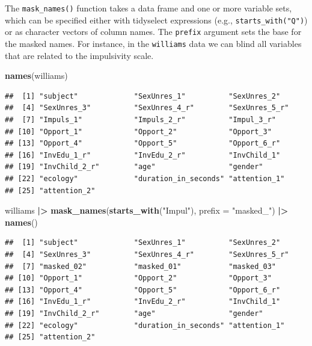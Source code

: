 \documentclass[
  english,
  man,floatsintext]{apa6}
\newenvironment{Shaded}{\begin{snugshade}}{\end{snugshade}}
\newcommand{\AttributeTok}[1]{\textcolor[rgb]{0.13,0.29,0.53}{#1}}
\newcommand{\FunctionTok}[1]{\textcolor[rgb]{0.13,0.29,0.53}{\textbf{#1}}}
\newcommand{\NormalTok}[1]{#1}
\newcommand{\SpecialCharTok}[1]{\textcolor[rgb]{0.81,0.36,0.00}{\textbf{#1}}}
\newcommand{\StringTok}[1]{\textcolor[rgb]{0.31,0.60,0.02}{#1}}
\begin{document}
The \texttt{mask\_names()} function takes a data frame and one or more variable sets, which can be specified either with tidyselect expressions (e.g., \texttt{starts\_with("Q")}) or as character vectors of column names. The \texttt{prefix} argument sets the base for the masked names. For instance, in the \texttt{williams} data we can blind all variables that are related to the impulsivity scale.

\begin{Shaded}
\begin{Highlighting}[]
\FunctionTok{names}\NormalTok{(williams)}
\end{Highlighting}
\end{Shaded}

\begin{verbatim}
##  [1] "subject"             "SexUnres_1"          "SexUnres_2"         
##  [4] "SexUnres_3"          "SexUnres_4_r"        "SexUnres_5_r"       
##  [7] "Impuls_1"            "Impuls_2_r"          "Impul_3_r"          
## [10] "Opport_1"            "Opport_2"            "Opport_3"           
## [13] "Opport_4"            "Opport_5"            "Opport_6_r"         
## [16] "InvEdu_1_r"          "InvEdu_2_r"          "InvChild_1"         
## [19] "InvChild_2_r"        "age"                 "gender"             
## [22] "ecology"             "duration_in_seconds" "attention_1"        
## [25] "attention_2"
\end{verbatim}

\begin{Shaded}
\begin{Highlighting}[]
\NormalTok{williams }\SpecialCharTok{|\textgreater{}} 
    \FunctionTok{mask\_names}\NormalTok{(}\FunctionTok{starts\_with}\NormalTok{(}\StringTok{"Impul"}\NormalTok{), }\AttributeTok{prefix =} \StringTok{"masked\_"}\NormalTok{) }\SpecialCharTok{|\textgreater{}} 
    \FunctionTok{names}\NormalTok{()}
\end{Highlighting}
\end{Shaded}

\begin{verbatim}
##  [1] "subject"             "SexUnres_1"          "SexUnres_2"         
##  [4] "SexUnres_3"          "SexUnres_4_r"        "SexUnres_5_r"       
##  [7] "masked_02"           "masked_01"           "masked_03"          
## [10] "Opport_1"            "Opport_2"            "Opport_3"           
## [13] "Opport_4"            "Opport_5"            "Opport_6_r"         
## [16] "InvEdu_1_r"          "InvEdu_2_r"          "InvChild_1"         
## [19] "InvChild_2_r"        "age"                 "gender"             
## [22] "ecology"             "duration_in_seconds" "attention_1"        
## [25] "attention_2"
\end{verbatim}
\end{document}
